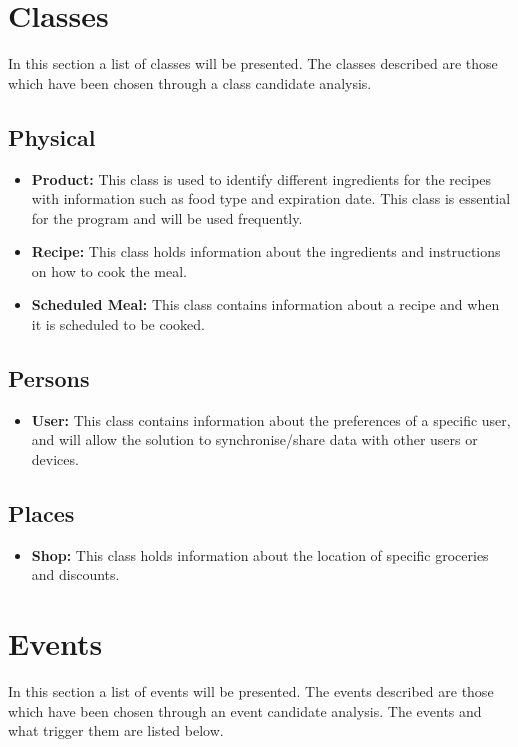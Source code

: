 \section{Classes}\label{ClassesLabel}
In this section a list of classes will be presented. The classes described are those which have been chosen through a class candidate analysis.

\subsection{Physical}
\begin{itemize}
\item \textbf{Product:} This class is used to identify different ingredients for the recipes with information such as food type and expiration date. This class is essential for the program and will be used frequently.
\item \textbf{Recipe:} This class holds information about the ingredients and instructions on how to cook the meal.
\item \textbf{Scheduled Meal:} This class contains information about a recipe and when it is scheduled to be cooked.
\end{itemize}

\subsection{Persons}
\begin{itemize}
\item \textbf{User:} This class contains information about the preferences of a specific user, and will allow the solution to synchronise/share data with other users or devices.
\end{itemize}

\subsection{Places}
\begin{itemize}
\item \textbf{Shop:} This class holds information about the location of specific groceries and discounts.
\end{itemize}

\section{Events}
In this section a list of events will be presented. The events described are those which have been chosen through an event candidate analysis. The events and what trigger them are listed below.
